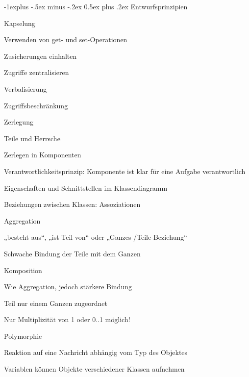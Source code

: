 \documentclass[a4paper]{article}
\makeatletter
\renewcommand{\subsection}{\@startsection{subsection}{2}{0mm}%
                                {-1explus -.5ex minus -.2ex}%
                                {0.5ex plus .2ex}%
                                {\normalfont\normalsize\bfseries}}
\makeatother
\begin{document}
\begin{multicols}{3}
  \subsection{Entwurfsprinzipien}
  \begin{itemize*}
    \item Kapselung
    \begin{itemize*}
      \item Verwenden von get- und set-Operationen
      \item Zusicherungen einhalten
      \item Zugriffe zentralisieren
      \item Verbalisierung
      \item Zugriffsbeschränkung
    \end{itemize*}
    \item Zerlegung
    \begin{itemize*}
      \item Teile und Herrsche
      \item Zerlegen in Komponenten
      \item Verantwortlichkeitsprinzip: Komponente ist klar für eine Aufgabe verantwortlich
      \item Eigenschaften und Schnittstellen im Klassendiagramm
      \item Beziehungen zwischen Klassen: Assoziationen
      \item Aggregation
      \begin{itemize*}
        \item „besteht aus“, „ist Teil von“ oder „Ganzes-/Teile-Beziehung“
        \item Schwache Bindung der Teile mit dem Ganzen
      \end{itemize*}
      \item Komposition
      \begin{itemize*}
        \item Wie Aggregation, jedoch stärkere Bindung
        \item Teil nur einem Ganzen zugeordnet
        \item Nur Multiplizität von 1 oder 0..1 möglich!
      \end{itemize*}
      \item Polymorphie
      \begin{itemize*}
        \item Reaktion auf eine Nachricht abhängig vom Typ des Objektes
        \item Variablen können Objekte verschiedener Klassen aufnehmen 

\end{itemize*}
\end{itemize*}
\end{itemize*}
\end{multicols}
\end{document}
